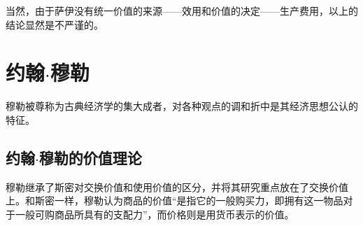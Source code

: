 当然，由于萨伊没有统一价值的来源——效用和价值的决定——生产费用，以上的结论显然是不严谨的。

\section{约翰$\cdot$穆勒}

 穆勒被尊称为古典经济学的集大成者，对各种观点的调和折中是其经济思想公认的特征\cite[165]{YanZhiJieXiFangJingJiXueShuoShiJiaoChengDiErBan2013}\cite[176-178]{CaiJiMingCongGuDianZhengZhiJingJiXueDaoZhongGuoTeSeSheHuiZhuYiZhengZhiJingJiXueJiYuZhongGuoShiJiaoDeZhengZhiJingJiXueYanBianShangCe2023}。
 
 \subsection{约翰$\cdot$穆勒的价值理论}

 穆勒继承了斯密对交换价值和使用价值的区分，并将其研究重点放在了交换价值上。和斯密一样，穆勒认为商品的价值“是指它的一般购买力，即拥有这一物品对于一般可购商品所具有的支配力”，而价格则是用货币表示的价值\cite[493]{YueHan*MuLeZhengZhiJingJiXueYuanLiJiQiZaiSheHuiZheXueShangDeRuoGanYingYongShangJuan1991}。

